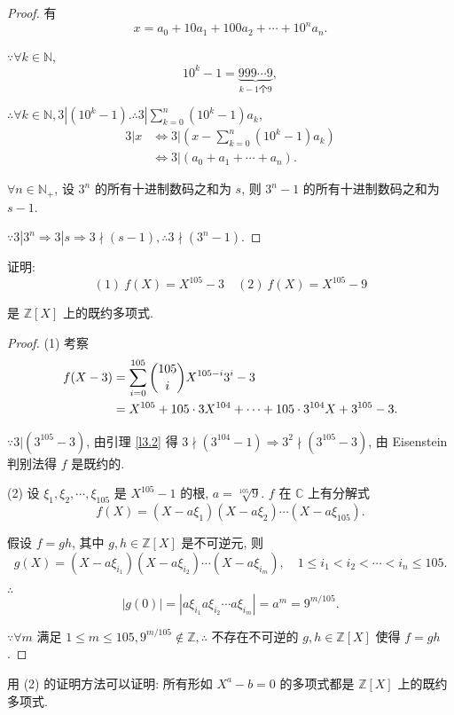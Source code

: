 \documentclass[color=black,device=normal,lang=cn,mode=geye]{elegantnote}
\begin{document}
\begin{proof}
    有
    \[x=a_0+10a_1+100a_2+\cdots+10^na_n.\]

    $\because\forall k\in\mathbb{N}$,
    \[10^k-1=\underbrace{999\cdots9}_{k-1\text{个}9},\]

    $\therefore\forall k\in\mathbb{N},3|(10^k-1).\therefore3|\sum\limits_{k=0}^n(10^k-1)a_k$,
    \begin{align*}
        3|x & \Leftrightarrow3\bigg|\left(x-\sum\limits_{k=0}^n(10^k-1)a_k\right) \\
        & \Leftrightarrow3|(a_0+a_1+\cdots+a_n).
    \end{align*}

    $\forall n\in\mathbb{N}_+$, 设 $3^n$ 的所有十进制数码之和为 $s$, 则 $3^n-1$ 的所有十进制数码之和为 $s-1$.
    
    $\because3|3^n\Rightarrow3|s\Rightarrow3\nmid(s-1),\therefore3\nmid(3^n-1)$.
\end{proof}
\begin{example}
    证明:
    \[(1)\ f(X)=X^{105}-3\quad(2)\ f(X)=X^{105}-9\]

    是 $\mathbb{Z}[X]$ 上的既约多项式.
\end{example}
\begin{proof}
    (1) 考察
    \begin{align*}
        f(X-3) & =\sum\limits_{i=0}^{105}\dbinom{105}{i}X^{105-i}3^i-3 \\
        & =X^{105}+105\cdot3X^{104}+\cdots+105\cdot3^{104}X+3^{105}-3.
    \end{align*}

    $\because3|(3^{105}-3)$, 由引理 \ref{l3.2} 得 $3\nmid(3^{104}-1)\Rightarrow3^2\nmid(3^{105}-3)$, 由 Eisenstein 判别法得 $f$ 是既约的.

    (2) 设 $\xi_1,\xi_2,\cdots,\xi_{105}$ 是 $X^{105}-1$ 的根, $a=\sqrt[105]{9}$. $f$ 在 $\mathbb{C}$ 上有分解式
    \[f(X)=(X-a\xi_1)(X-a\xi_2)\cdots(X-a\xi_{105}).\]

    假设 $f=gh$, 其中 $g,h\in\mathbb{Z}[X]$ 是不可逆元, 则
    \[g(X)=(X-a\xi_{i_1})(X-a\xi_{i_2})\cdots(X-a\xi_{i_m}),\quad1\leq i_1<i_2<\cdots<i_n\leq105.\]

    $\therefore$
    \[|g(0)|=|a\xi_{i_1}a\xi_{i_2}\cdots a\xi_{i_m}|=a^m=9^{m/105}.\]

    $\because\forall m$ 满足 $1\leq m\leq105,9^{m/105}\notin\mathbb{Z},\therefore$ 不存在不可逆的 $g,h\in\mathbb{Z}[X]$ 使得 $f=gh$.
\end{proof}
\begin{note}
    用 (2) 的证明方法可以证明: 所有形如 $X^a-b=0$ 的多项式都是 $\mathbb{Z}[X]$ 上的既约多项式.
\end{note}
\end{document}
